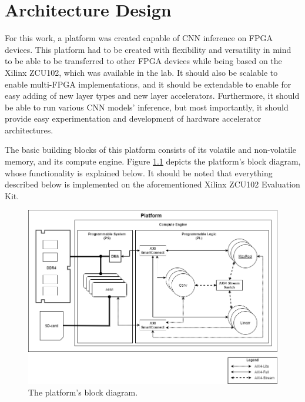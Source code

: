 \chapter{Architecture Design}
\label{Chapter-Architecture-Design}

For this work, a platform was created capable of CNN inference on FPGA devices. This platform had to be created with flexibility and versatility in mind to be able to be transferred to other FPGA devices while being based on the Xilinx ZCU102, which was available in the lab. It should also be scalable to enable multi-FPGA implementations, and it should be extendable to enable for easy adding of new layer types and new layer accelerators. Furthermore, it should be able to run various CNN models' inference, but most importantly, it should provide easy experimentation and development of hardware accelerator architectures.

The basic building blocks of this platform consists of its volatile and non-volatile memory, and its compute engine. Figure \ref{fig:platform-block-diagram} depicts the platform's block diagram, whose functionality is explained below. It should be noted that everything described below is implemented on the aforementioned Xilinx ZCU102 Evaluation Kit.

\begin{figure} [H]
	\centering
	\includegraphics[width=\textwidth]{../Images/Platform/platform.png}
	\decoRule
	\caption[The platform's block diagram]{The platform's block diagram.}
	\label{fig:platform-block-diagram}
\end{figure}

